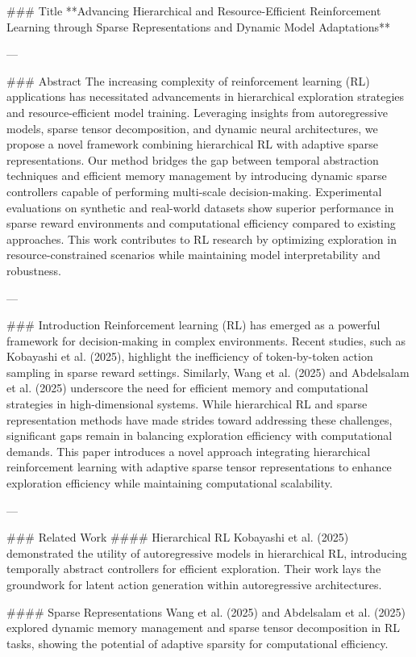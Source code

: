 ### Title  
**Advancing Hierarchical and Resource-Efficient Reinforcement Learning through Sparse Representations and Dynamic Model Adaptations**

---

### Abstract  
The increasing complexity of reinforcement learning (RL) applications has necessitated advancements in hierarchical exploration strategies and resource-efficient model training. Leveraging insights from autoregressive models, sparse tensor decomposition, and dynamic neural architectures, we propose a novel framework combining hierarchical RL with adaptive sparse representations. Our method bridges the gap between temporal abstraction techniques and efficient memory management by introducing dynamic sparse controllers capable of performing multi-scale decision-making. Experimental evaluations on synthetic and real-world datasets show superior performance in sparse reward environments and computational efficiency compared to existing approaches. This work contributes to RL research by optimizing exploration in resource-constrained scenarios while maintaining model interpretability and robustness.

---

### Introduction  
Reinforcement learning (RL) has emerged as a powerful framework for decision-making in complex environments. Recent studies, such as Kobayashi et al. (2025), highlight the inefficiency of token-by-token action sampling in sparse reward settings. Similarly, Wang et al. (2025) and Abdelsalam et al. (2025) underscore the need for efficient memory and computational strategies in high-dimensional systems. While hierarchical RL and sparse representation methods have made strides toward addressing these challenges, significant gaps remain in balancing exploration efficiency with computational demands. This paper introduces a novel approach integrating hierarchical reinforcement learning with adaptive sparse tensor representations to enhance exploration efficiency while maintaining computational scalability.

---

### Related Work  
#### Hierarchical RL  
Kobayashi et al. (2025) demonstrated the utility of autoregressive models in hierarchical RL, introducing temporally abstract controllers for efficient exploration. Their work lays the groundwork for latent action generation within autoregressive architectures.

#### Sparse Representations  
Wang et al. (2025) and Abdelsalam et al. (2025) explored dynamic memory management and sparse tensor decomposition in RL tasks, showing the potential of adaptive sparsity for computational efficiency.

